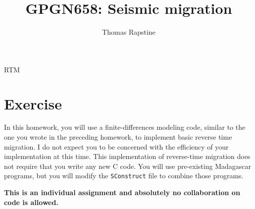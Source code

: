 \author{Thomas Rapstine}
\title{GPGN658: Seismic migration}{RTM}







\section{Exercise}

In this homework, you will use a finite-differences modeling code,
similar to the one you wrote in the preceding homework, to implement
basic reverse time migration. I do not expect you to be concerned with
the efficiency of your implementation at this time. This
implementation of reverse-time migration does not require that you
write any new C code. You will use pre-existing Madagascar programs,
but you will modify the \texttt{SConstruct} file to combine those
programs.

\textbf{This is an individual assignment and absolutely no
  collaboration on code is allowed.}

